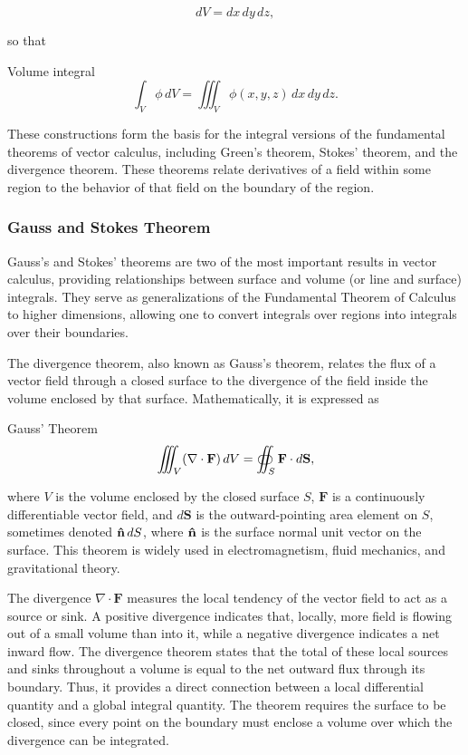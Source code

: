 			\begin{equation}
				dV = dx\,dy\,dz,
			\end{equation}

			so that
			\begin{definition}{Volume integral}
				\begin{equation}
					\int_V \phi\,dV
					=
					\iiint_V
					\phi(x,y,z)\,dx\,dy\,dz.
				\end{equation}
			\end{definition}

			These constructions form the basis for the integral versions of the fundamental theorems of vector calculus, including Green's theorem, Stokes' theorem, and the divergence theorem. These theorems relate derivatives of a field within some region to the behavior of that field on the boundary of the region.
			\newpage
	\subsubsection{Gauss and Stokes Theorem}

		Gauss's and Stokes' theorems are two of the most important results in vector calculus, providing relationships between surface and volume (or line and surface) integrals. They serve as generalizations of the Fundamental Theorem of Calculus to higher dimensions, allowing one to convert integrals over regions into integrals over their boundaries.

			The divergence theorem, also known as Gauss's theorem, relates the flux of a vector field through a closed surface to the divergence of the field inside the volume enclosed by that surface. Mathematically, it is expressed as
			\begin{theorem}{Gauss' Theorem}
				\begin{equation}
					\iiint_V (\nabla \cdot \vb{F}) \dd{V} = \oiint_S \mathbf{F} \cdot d\mathbf{S},
				\end{equation}
			\end{theorem}
			where $V$ is the volume enclosed by the closed surface $S$, $\mathbf{F}$ is a continuously differentiable vector field, and $d\mathbf{S}$ is the outward-pointing area element on $S$, sometimes denoted $\vu{n}\dd{S}$, where
			$\vu{n}$ is the surface normal unit vector on the surface.
			This theorem is widely used in electromagnetism, fluid mechanics, and gravitational theory.

			The divergence $\nabla\cdot\mathbf{F}$ measures the local tendency of the vector field to act as a source or sink. A positive divergence indicates that, locally, more field is flowing out of a small volume than into it, while a negative divergence indicates a net inward flow. The divergence theorem states that the total of these local sources and sinks throughout a volume is equal to the net outward flux through its boundary. Thus, it provides a direct connection between a local differential quantity and a global integral quantity. The theorem requires the surface to be closed, since every point on the boundary must enclose a volume over which the divergence can be integrated.

